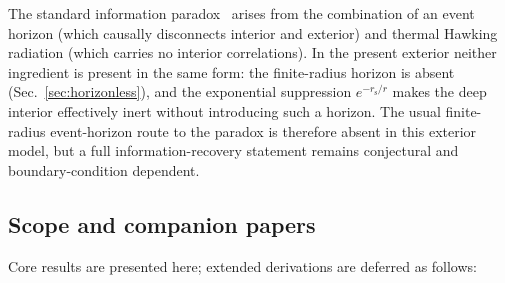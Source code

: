 \documentclass[aps,prd,onecolumn,superscriptaddress,nofootinbib,showpacs,12pt]{revtex4-2}
\newcommand{\rs}{r_{\mathrm{s}}}
\begin{document}
The standard information paradox~\cite{Hawking1976}
arises from the combination of an event horizon (which
causally disconnects interior and exterior) and thermal
Hawking radiation (which carries no interior
correlations).  In the present exterior neither ingredient
is present in the same form: the finite-radius horizon
is absent (Sec.~\ref{sec:horizonless}), and the exponential
suppression $e^{-\rs/r}$ makes the deep interior effectively
inert without introducing such a horizon.  The usual
finite-radius event-horizon route to the paradox is therefore
absent in this exterior model, but a full information-recovery
statement remains conjectural and boundary-condition dependent.

\subsection{Scope and companion papers}\label{sec:limitations}

Core results are presented here; extended derivations are
deferred as follows:
\end{document}

